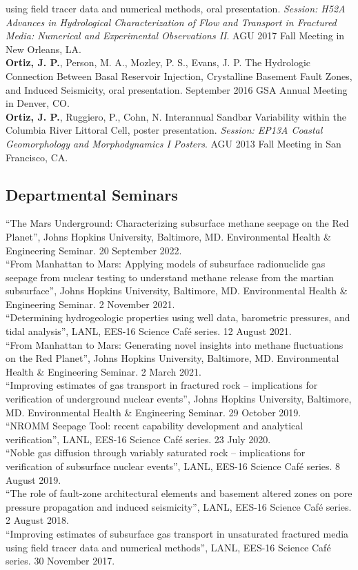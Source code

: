 \documentclass[11pt, letterpaper]{article}
\newcommand{\years}[1]{\marginnote{\scriptsize #1}}
\begin{document}
using field tracer data and numerical methods, oral presentation.
\textit{Session: H52A Advances in Hydrological Characterization of Flow and
Transport in Fractured Media: Numerical and Experimental Observations II}. AGU
2017 Fall Meeting in New Orleans, LA.\\
\years{2016}\textbf{Ortiz, J. P.}, Person, M. A., Mozley, P. S., Evans, J. P.
The Hydrologic Connection Between Basal Reservoir Injection, Crystalline
Basement Fault Zones, and Induced Seismicity, oral presentation. September 2016
GSA Annual Meeting in Denver, CO.\\
\years{2013}\textbf{Ortiz, J. P.}, Ruggiero, P., Cohn, N. Interannual Sandbar
Variability within the Columbia River Littoral Cell, poster presentation.
\textit{Session: EP13A Coastal Geomorphology and Morphodynamics I Posters}.
AGU 2013 Fall Meeting in San Francisco, CA.

\subsection*{Departmental Seminars}
\years{2022} ``The Mars Underground: Characterizing subsurface methane seepage
on the Red Planet'', Johns Hopkins University, Baltimore, MD.
Environmental Health \& Engineering Seminar. 20 September 2022.\\
\years{2021} ``From Manhattan to Mars: Applying models of subsurface
radionuclide gas seepage from nuclear testing to understand methane release
from the martian subsurface'', Johns Hopkins University, Baltimore, MD.
Environmental Health \& Engineering Seminar. 2 November 2021.\\
\years{2021} ``Determining hydrogeologic properties using well data, barometric
pressures, and tidal analysis'', LANL, EES-16 Science Café series. 12 August 
2021.\\
\years{2021} ``From Manhattan to Mars: Generating novel insights into methane
fluctuations on the Red Planet'', Johns Hopkins University, Baltimore, MD.
Environmental Health \& Engineering Seminar. 2 March 2021.\\
\years{2019} ``Improving estimates of gas transport in fractured rock --
implications for verification of underground nuclear events'', Johns Hopkins
University, Baltimore, MD. Environmental Health \& Engineering Seminar. 29
October 2019.\\
\years{2020} ``NROMM Seepage Tool: recent capability development and analytical
verification'', LANL, EES-16 Science Café series. 23 July 2020.\\
\years{2019} ``Noble gas diffusion through variably saturated rock --
implications for verification of subsurface nuclear events'', LANL,
EES-16 Science Café series. 8 August 2019.\\
\years{2018} ``The role of fault-zone architectural elements and basement
altered zones on pore pressure propagation and induced seismicity'', LANL,
EES-16 Science Café series. 2 August 2018.\\
\years{2017} ``Improving estimates of subsurface gas transport in unsaturated
fractured media using field tracer data and numerical methods'', LANL, EES-16
Science Café series. 30 November 2017.\\
\end{document}
